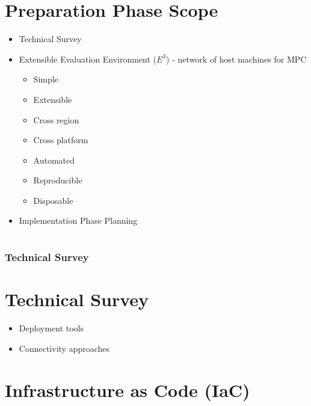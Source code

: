 \hypertarget{preparation-phase-scope}{%
\part{Preparation Phase Scope}\label{preparation-phase-scope}}

\begin{itemize}
\tightlist
\item
  Technical Survey
\item
  Extensible Evaluation Environment (\(E^3\)) - network of host machines
  for MPC

  \begin{itemize}
  \tightlist
  \item
    Simple
  \item
    Extensible
  \item
    Cross region
  \item
    Cross platform
  \item
    Automated
  \item
    Reproducible
  \item
    Disposable
  \end{itemize}
\item
  Implementation Phase Planning
\end{itemize}

\hypertarget{section}{%
\part{}\label{section}}

\section{Technical Survey}

\hypertarget{technical-survey}{%
\part{Technical Survey}\label{technical-survey}}

\begin{itemize}
\tightlist
\item
  Deployment tools
\item
  Connectivity approaches
\end{itemize}

\hypertarget{infrastructure-as-code-iac}{%
\part{Infrastructure as Code (IaC)}\label{infrastructure-as-code-iac}}

